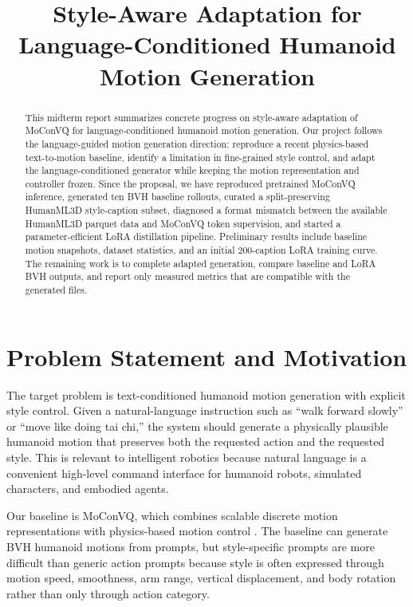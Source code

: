 \documentclass[conference]{IEEEtran}
\title{Style-Aware Adaptation for Language-Conditioned Humanoid Motion Generation}
\author{\IEEEauthorblockN{Haotian Wu, Yuhua Luo, and Xuyang Yuan}}
\begin{document}
\maketitle

\begin{abstract}
This midterm report summarizes concrete progress on style-aware adaptation of MoConVQ for language-conditioned humanoid motion generation. Our project follows the language-guided motion generation direction: reproduce a recent physics-based text-to-motion baseline, identify a limitation in fine-grained style control, and adapt the language-conditioned generator while keeping the motion representation and controller frozen. Since the proposal, we have reproduced pretrained MoConVQ inference, generated ten BVH baseline rollouts, curated a split-preserving HumanML3D style-caption subset, diagnosed a format mismatch between the available HumanML3D parquet data and MoConVQ token supervision, and started a parameter-efficient LoRA distillation pipeline. Preliminary results include baseline motion snapshots, dataset statistics, and an initial 200-caption LoRA training curve. The remaining work is to complete adapted generation, compare baseline and LoRA BVH outputs, and report only measured metrics that are compatible with the generated files.
\end{abstract}

\IEEEpeerreviewmaketitle

\section{Problem Statement and Motivation}
The target problem is text-conditioned humanoid motion generation with explicit style control. Given a natural-language instruction such as ``walk forward slowly'' or ``move like doing tai chi,'' the system should generate a physically plausible humanoid motion that preserves both the requested action and the requested style. This is relevant to intelligent robotics because natural language is a convenient high-level command interface for humanoid robots, simulated characters, and embodied agents.

Our baseline is MoConVQ, which combines scalable discrete motion representations with physics-based motion control \cite{yao2024moconvq}. The baseline can generate BVH humanoid motions from prompts, but style-specific prompts are more difficult than generic action prompts because style is often expressed through motion speed, smoothness, arm range, vertical displacement, and body rotation rather than only through action category.
\end{document}

